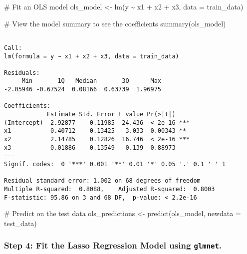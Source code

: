 \documentclass[
  letterpaper,
  DIV=11,
  numbers=noendperiod]{scrartcl}
\newenvironment{Shaded}{\begin{snugshade}}{\end{snugshade}}
\newcommand{\AttributeTok}[1]{\textcolor[rgb]{0.40,0.45,0.13}{#1}}
\newcommand{\CommentTok}[1]{\textcolor[rgb]{0.37,0.37,0.37}{#1}}
\newcommand{\FunctionTok}[1]{\textcolor[rgb]{0.28,0.35,0.67}{#1}}
\newcommand{\NormalTok}[1]{\textcolor[rgb]{0.00,0.23,0.31}{#1}}
\newcommand{\OtherTok}[1]{\textcolor[rgb]{0.00,0.23,0.31}{#1}}
\newcommand{\SpecialCharTok}[1]{\textcolor[rgb]{0.37,0.37,0.37}{#1}}
\begin{document}
\begin{Shaded}
\begin{Highlighting}[]
\CommentTok{\# Fit an OLS model}
\NormalTok{ols\_model }\OtherTok{\textless{}{-}} \FunctionTok{lm}\NormalTok{(y }\SpecialCharTok{\textasciitilde{}}\NormalTok{ x1 }\SpecialCharTok{+}\NormalTok{ x2 }\SpecialCharTok{+}\NormalTok{ x3, }\AttributeTok{data =}\NormalTok{ train\_data)}

\CommentTok{\# View the model summary to see the coefficients}
\FunctionTok{summary}\NormalTok{(ols\_model)}
\end{Highlighting}
\end{Shaded}

\begin{verbatim}

Call:
lm(formula = y ~ x1 + x2 + x3, data = train_data)

Residuals:
     Min       1Q   Median       3Q      Max 
-2.05946 -0.67524  0.08166  0.63739  1.96975 

Coefficients:
            Estimate Std. Error t value Pr(>|t|)    
(Intercept)  2.92877    0.11985  24.436  < 2e-16 ***
x1           0.40712    0.13425   3.033  0.00343 ** 
x2           2.14785    0.12826  16.746  < 2e-16 ***
x3           0.01886    0.13549   0.139  0.88973    
---
Signif. codes:  0 '***' 0.001 '**' 0.01 '*' 0.05 '.' 0.1 ' ' 1

Residual standard error: 1.002 on 68 degrees of freedom
Multiple R-squared:  0.8088,    Adjusted R-squared:  0.8003 
F-statistic: 95.86 on 3 and 68 DF,  p-value: < 2.2e-16
\end{verbatim}

\begin{Shaded}
\begin{Highlighting}[]
\CommentTok{\# Predict on the test data}
\NormalTok{ols\_predictions }\OtherTok{\textless{}{-}} \FunctionTok{predict}\NormalTok{(ols\_model, }\AttributeTok{newdata =}\NormalTok{ test\_data)}
\end{Highlighting}
\end{Shaded}

\hypertarget{step-4-fit-the-lasso-regression-model-using-glmnet.}{%
\subsubsection{\texorpdfstring{Step 4: Fit the Lasso Regression Model
using
\texttt{glmnet}.}{Step 4: Fit the Lasso Regression Model using glmnet.}}\label{step-4-fit-the-lasso-regression-model-using-glmnet.}}
\end{document}

